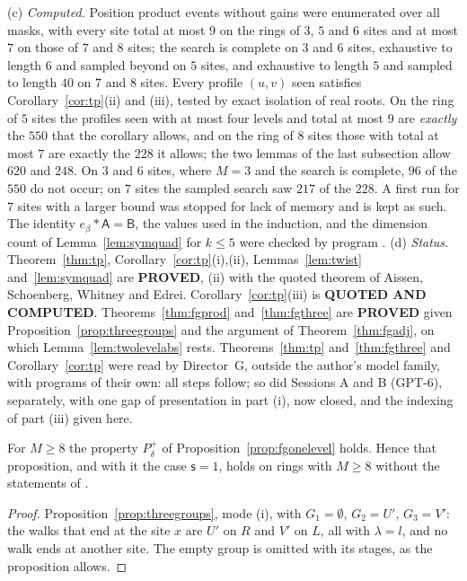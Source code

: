 \begin{remark}
(c) \emph{Computed.} Position product events without gains were enumerated over all masks, with every site total at most $9$ on the rings of $3$, $5$ and $6$ sites and at most $7$ on those of $7$ and $8$ sites; the search is complete on $3$ and $6$ sites, exhaustive to length $6$ and sampled beyond on $5$ sites, and exhaustive to length $5$ and sampled to length $40$ on $7$ and $8$ sites. Every profile $(u,v)$ seen satisfies Corollary~\ref{cor:tp}(ii) and (iii), tested by exact isolation of real roots. On the ring of $5$ sites the profiles seen with at most four levels and total at most $9$ are \emph{exactly} the $550$ that the corollary allows, and on the ring of $8$ sites those with total at most $7$ are exactly the $228$ it allows; the two lemmas of the last subsection allow $620$ and $248$. On $3$ and $6$ sites, where $M=3$ and the search is complete, $96$ of the $550$ do not occur; on $7$ sites the sampled search saw $217$ of the $228$. A first run for $7$ sites with a larger bound was stopped for lack of memory and is kept as such. The identity $e_\beta*\mathsf{A}=\mathsf{B}$, the values used in the induction, and the dimension count of Lemma~\ref{lem:symquad} for $k\le5$ were checked by program \cite{comptp}.
(d) \emph{Status.} Theorem~\ref{thm:tp}, Corollary~\ref{cor:tp}(i),(ii), Lemmas~\ref{lem:twist} and~\ref{lem:symquad} are \textbf{PROVED}, (ii) with the quoted theorem of Aissen, Schoenberg, Whitney and Edrei. Corollary~\ref{cor:tp}(iii) is \textbf{QUOTED AND COMPUTED}. Theorems~\ref{thm:fgprod} and~\ref{thm:fgthree} are \textbf{PROVED} given Proposition~\ref{prop:threegroups} and the argument of Theorem~\ref{thm:fgadj}, on which Lemma~\ref{lem:twolevelabs} rests. Theorems~\ref{thm:tp} and~\ref{thm:fgthree} and Corollary~\ref{cor:tp} were read by Director~G, outside the author's model family, with programs of their own: all steps follow; so did Sessions A and B (GPT-6), separately, with one gap of presentation in part (i), now closed, and the indexing of part (iii) given here.
\end{remark}

\begin{corollary}\label{cor:pplus8}
For $M\ge8$ the property $P^{+}_\delta$ of Proposition~\ref{prop:fgonelevel} holds. Hence that proposition, and with it the case $\mathsf{s}=1$, holds on rings with $M\ge8$ without the statements of \cite{dgone}.
\end{corollary}
\begin{proof}
Proposition~\ref{prop:threegroups}, mode (i), with $G_1=\emptyset$, $G_2=U'$, $G_3=V'$: the walks that end at the site $x$ are $U'$ on $R$ and $V'$ on $L$, all with $\lambda=l$, and no walk ends at another site. The empty group is omitted with its stages, as the proposition allows.
\end{proof}


